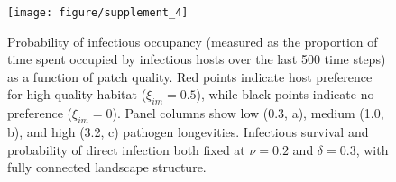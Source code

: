 \documentclass{article}
\begin{document}
\begin{figure}
\texttt{[image: figure/supplement\_4]}
\centering
\caption{Probability of infectious occupancy (measured as the proportion of time spent occupied by infectious hosts over the last 500 time steps) as a function of patch quality. Red points indicate host preference for high quality habitat ($\xi_{im} = 0.5$), while black points indicate no preference ($\xi_{im} = 0$). Panel columns show low (0.3, a), medium (1.0, b), and high (3.2, c) pathogen longevities.  Infectious survival and probability of direct infection both fixed at $\nu = 0.2$ and $\delta = 0.3$, with fully connected landscape structure.}
\end{figure}
\end{document}
